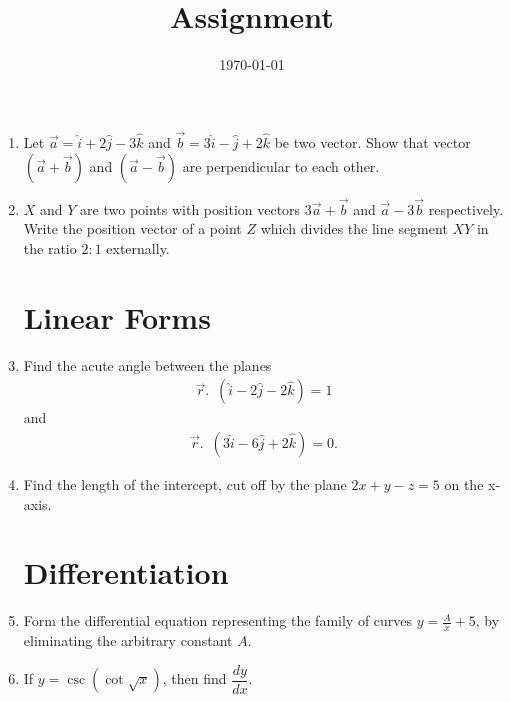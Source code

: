 \documentclass[12pt,-letter paper]{article}
\title{Assignment}
\date{\today}
\providecommand{\brak}[1]{\ensuremath{\left(#1\right)}}
\begin{document}

\begin{enumerate}
\section{Vectros}
      \item Let $\overrightarrow{a}=\hat{i}+2\hat{j}-3\hat{k}$ and $\overrightarrow{b}=3\hat{i}-\hat{j}+2\hat{k}$ be two vector. Show that vector $\brak{\overrightarrow{a}+\overrightarrow{b}}$ and $\brak{\overrightarrow{a}-\overrightarrow{b}}$ are perpendicular to each other. 

      \item $X$ and $Y$ are two points with position vectors $3\overrightarrow{a}+\overrightarrow{b}$ and $\overrightarrow{a}-3\overrightarrow{b}$ respectively. Write the position vector of a point $Z$ which divides the line segment $XY$ in the ratio $2:1$ externally.
    
\section{Linear Forms}
    \item Find the acute angle between the planes 
        \begin{align*}
         \overrightarrow{r}.\hspace{6pt}\brak{\hat{i}-2\hat{j}-2\hat{k}}=1
         \end{align*}
      and 
        \begin{align*}
          \overrightarrow{r}.\hspace{6pt}\brak{3\hat{i}-6\hat{j}+2\hat{k}}=0.
         \end{align*}

    \item Find the length of the intercept, cut off by the plane $2x+y-z=5$ on the x-axis.


\section{Differentiation}
    \item Form the differential equation representing the family of curves $y=\frac{A}{x}+5$, by eliminating the arbitrary constant $A$.

    \item If $y=\csc{\brak{\cot{\sqrt{x}}}}$, then find $\dfrac{dy}{dx}$.


\end{enumerate}
\end{document}
